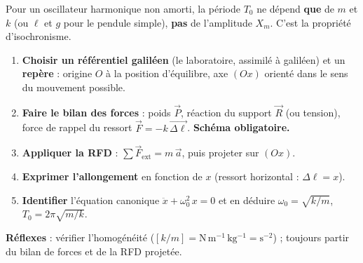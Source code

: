 \documentclass[11pt]{article}
\newcommand{\cle}[1]{{\popxbold\color{popdark}#1}}
\begin{document}
\begin{aretenir}[Isochronisme]
Pour un oscillateur harmonique non amorti, la période $T_0$ ne dépend \textbf{que} de $m$ et $k$ (ou $\ell$ et $g$ pour le pendule simple), \textbf{pas} de l'amplitude $X_m$. C'est la propriété d'\cle{isochronisme}.
\end{aretenir}

\begin{methode}
\begin{enumerate}
\item \textbf{Choisir un référentiel galiléen} (le laboratoire, assimilé à galiléen) et un \textbf{repère} : origine $O$ à la position d'équilibre, axe $(Ox)$ orienté dans le sens du mouvement possible.
\item \textbf{Faire le bilan des forces} : poids $\vec{P}$, réaction du support $\vec{R}$ (ou tension), force de rappel du ressort $\vec{F} = -k\,\vec{\Delta\ell}$. \textbf{Schéma obligatoire.}
\item \textbf{Appliquer la RFD} : $\sum \vec{F}_{\text{ext}} = m\,\vec{a}$, puis projeter sur $(Ox)$.
\item \textbf{Exprimer l'allongement} en fonction de $x$ (ressort horizontal : $\Delta\ell = x$).
\item \textbf{Identifier} l'équation canonique $\ddot{x} + \omega_0^2\,x = 0$ et en déduire $\omega_0 = \sqrt{k/m}$, $T_0 = 2\pi\sqrt{m/k}$.
\end{enumerate}
\textbf{Réflexes} : vérifier l'homogénéité ($[k/m] = \mathrm{N\,m^{-1}\,kg^{-1}} = \mathrm{s^{-2}}$) ; toujours partir du bilan de forces et de la RFD projetée.
\end{methode}
\end{document}
